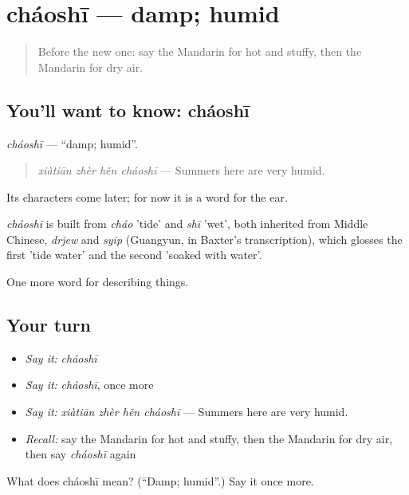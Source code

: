 \section[cháoshī]{cháoshī — damp; humid}

\label{lesson:ZH-C218-chaoshi}



\begin{quote}
Before the new one: say the Mandarin for hot and stuffy, then the Mandarin for dry air.
\end{quote}

\subsection*{You'll want to know: cháoshī}
\emph{cháoshī} — \textquotedblleft{}damp; humid\textquotedblright{}.

\begin{quote}
\emph{xiàtiān zhèr hěn cháoshī} — Summers here are very humid.
\end{quote}

Its characters come later; for now it is a word for the ear.

\begin{cousinweb}
\emph{cháoshī} is built from \emph{cháo} 'tide' and \emph{shī} 'wet', both inherited from Middle Chinese, \emph{drjew} and \emph{syip} (Guangyun, in Baxter's transcription), which glosses the first 'tide water' and the second 'soaked with water'.
\end{cousinweb}

\begin{grammarlens}[title={What you've built}]
One more word for describing things.
\end{grammarlens}

\subsection*{Your turn}
\begin{itemize}
\raggedright
  \item \emph{Say it:} \emph{cháoshī}
  \item \emph{Say it:} \emph{cháoshī}, once more
  \item \emph{Say it:} \emph{xiàtiān zhèr hěn cháoshī} — Summers here are very humid.
  \item \emph{Recall:} say the Mandarin for hot and stuffy, then the Mandarin for dry air, then say \emph{cháoshī} again
\end{itemize}

\begin{tcolorbox}[breakable,colback=teal!4,colframe=teal!35!black,title={Before you move on}]
What does cháoshī mean? (\textquotedblleft{}Damp; humid\textquotedblright{}.) Say it once more.
\end{tcolorbox}
